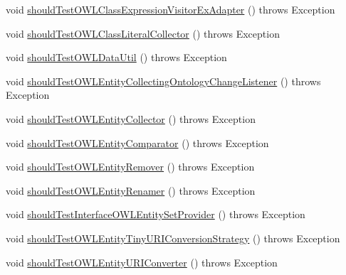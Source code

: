 \begin{DoxyCompactItemize}
\item 
void \hyperlink{classorg_1_1semanticweb_1_1owlapi_1_1contract_1_1_contract_owlapi_util_test_a8c83a5bf3ab34257e5419c3c6900ed53}{should\-Test\-O\-W\-L\-Class\-Expression\-Visitor\-Ex\-Adapter} ()  throws Exception 
\item 
void \hyperlink{classorg_1_1semanticweb_1_1owlapi_1_1contract_1_1_contract_owlapi_util_test_a7eff6109198c6424992e9d986464b0d1}{should\-Test\-O\-W\-L\-Class\-Literal\-Collector} ()  throws Exception 
\item 
void \hyperlink{classorg_1_1semanticweb_1_1owlapi_1_1contract_1_1_contract_owlapi_util_test_a98a3da5e25539acea29753c1c433405d}{should\-Test\-O\-W\-L\-Data\-Util} ()  throws Exception 
\item 
void \hyperlink{classorg_1_1semanticweb_1_1owlapi_1_1contract_1_1_contract_owlapi_util_test_a3f0ed092844b79e3d6c3e1698f6386b9}{should\-Test\-O\-W\-L\-Entity\-Collecting\-Ontology\-Change\-Listener} ()  throws Exception 
\item 
void \hyperlink{classorg_1_1semanticweb_1_1owlapi_1_1contract_1_1_contract_owlapi_util_test_ad77fe7a28679445dbe9e42f11f9bbffd}{should\-Test\-O\-W\-L\-Entity\-Collector} ()  throws Exception 
\item 
void \hyperlink{classorg_1_1semanticweb_1_1owlapi_1_1contract_1_1_contract_owlapi_util_test_af3cff61cb74c0ec69f46bfffdce322b3}{should\-Test\-O\-W\-L\-Entity\-Comparator} ()  throws Exception 
\item 
void \hyperlink{classorg_1_1semanticweb_1_1owlapi_1_1contract_1_1_contract_owlapi_util_test_ad85cd23798e5461a235d1cb2c34bb7da}{should\-Test\-O\-W\-L\-Entity\-Remover} ()  throws Exception 
\item 
void \hyperlink{classorg_1_1semanticweb_1_1owlapi_1_1contract_1_1_contract_owlapi_util_test_a7bb49b090236e20e78545d16b2db3fbb}{should\-Test\-O\-W\-L\-Entity\-Renamer} ()  throws Exception 
\item 
void \hyperlink{classorg_1_1semanticweb_1_1owlapi_1_1contract_1_1_contract_owlapi_util_test_adeb53b5ee8db9c8922743bcc3824b476}{should\-Test\-Interface\-O\-W\-L\-Entity\-Set\-Provider} ()  throws Exception 
\item 
void \hyperlink{classorg_1_1semanticweb_1_1owlapi_1_1contract_1_1_contract_owlapi_util_test_aa14896aa42bba70690a607035c39f7d6}{should\-Test\-O\-W\-L\-Entity\-Tiny\-U\-R\-I\-Conversion\-Strategy} ()  throws Exception 
\item 
void \hyperlink{classorg_1_1semanticweb_1_1owlapi_1_1contract_1_1_contract_owlapi_util_test_a11886daed7f36cffcc5c754325b8edd1}{should\-Test\-O\-W\-L\-Entity\-U\-R\-I\-Converter} ()  throws Exception 

\end{DoxyCompactItemize}
